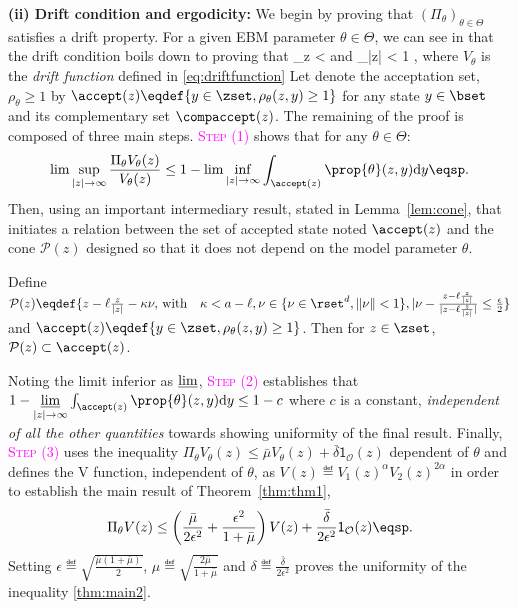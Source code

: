 \documentclass[10pt,twocolumn,letterpaper]{article}
\begin{document}
\medskip
\noindent \textbf{(ii) Drift condition and ergodicity: }
We begin by proving that $(\Pi_\theta)_{\theta \in \Theta}$ satisfies a drift property.
For a given EBM parameter $\theta \in \Theta$, we can see in \cite{jarner2000geometric} that the drift condition boils down to proving that
\beq\notag
\sup \limits_{z \in \zset}   < \infty \quad \textrm{and} \quad \lim \sup \limits_{|z| \to \infty}   < 1 \eqsp,
\eeq
where $V_\theta$ is the \emph{drift function} defined in \eqref{eq:driftfunction}
Let denote the acceptation set, \ie\ $\rho_\theta \geq 1$ by $\accept(z) \eqdef \{ y \in \zset, \rho_\theta(z,y) \geq 1 \}$ for any state $y \in \bset$ and its complementary set $\compaccept(z)$.
The remaining of the proof is composed of three main steps. 
\textcolor{magenta}{\textsc{Step (1)}} shows that for any $\theta \in \Theta$:
\begin{align}\notag
\lim \sup \limits_{|z| \to \infty}  \frac{\Pi_\theta V_\theta(z)}{V_\theta(z)} \leq 1 - \lim \inf \limits_{|z| \to \infty}  \int_{\accept(z)} \prop{\theta}(z,y)  \textrm{d}y \eqsp.
\end{align}
Then, using an important intermediary result, stated in Lemma~\ref{lem:cone}, that initiates a relation between the set of accepted state noted $\accept(z)$ and the cone $\mathcal{P}(z)$ designed so that it does not depend on the model parameter $\theta$. 
\begin{lemm}\label{lem:cone}
Define $\mathcal{P}(z) \eqdef \{ z- \ell \frac{z}{|z|} - \kappa \nu , \, \textrm{with} \quad \kappa < a - \ell  , \nu \in \{ \nu \in \rset^d, \| \nu \| < 1\}, |\nu - \frac{z- \ell \frac{z}{|z|} }{|z- \ell \frac{z}{|z|} |} \leq \frac{\epsilon}{2}   \}$ and $\accept(z) \eqdef \{ y \in \zset, \rho_\theta(z,y) \geq 1 \}$. Then for $z \in \zset$, $\mathcal{P}(z) \subset \accept(z)$.
\end{lemm}
Noting the limit inferior as $\varliminf$, 
\textcolor{magenta}{\textsc{Step (2)}} establishes that $1 - \varliminf \limits_{|z| \to \infty}  \int_{\accept(z)} \prop{\theta}(z,y)  \textrm{d}y \leq 1 - c$ where $c$ is a constant, \emph{independent of all the other quantities} towards showing uniformity of the final result.
Finally, 
\textcolor{magenta}{\textsc{Step (3)}} uses the inequality $\Pi_\theta V_\theta(z) \leq \bar{\mu} V_\theta(z) + \bar{\delta} \mathsf{1}_{\mathcal{O}}(z)$ dependent of $\theta$ and defines the V function, independent of $\theta$, as $V(z) \eqdef V_1(z)^\alpha V_2(z)^{2\alpha}$ in order to establish the main result of Theorem~\ref{thm:thm1}, \ie
\begin{align}\notag
\Pi_\theta V(z) \leq \left(\frac{\bar{\mu}}{2 \epsilon^2} + \frac{\epsilon^2}{1 + \bar{\mu}} \right) V(z) +\frac{\bar{\delta}}{2 \epsilon^2} \mathsf{1}_{\mathcal{O}}(z) \eqsp.
\end{align}
Setting $\epsilon \eqdef \sqrt{\frac{\bar{\mu}(1+\bar{\mu})}{2}}$, $ \mu  \eqdef  \sqrt{\frac{2\bar{\mu}}{1+\bar{\mu}}}$ and $\delta \eqdef \frac{\bar{\delta}}{2 \epsilon^2}$ proves the uniformity of the inequality \eqref{thm:main2}.
\end{document}
